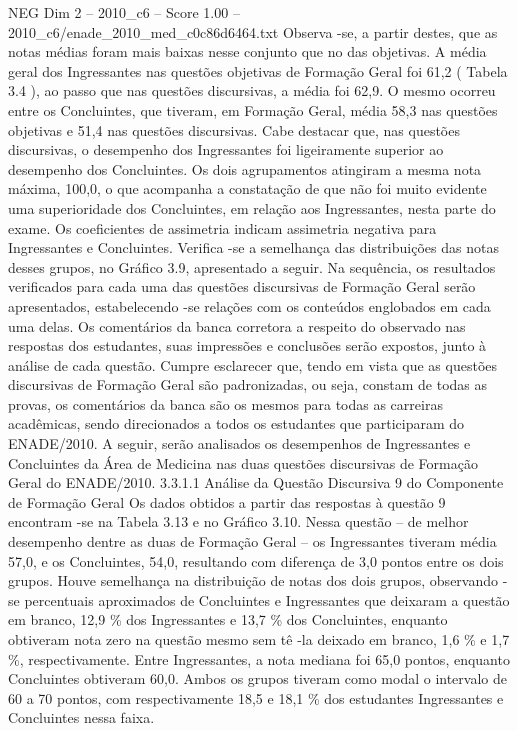 \begin{textsample}{NEG Dim 2 – 2010\_c6 – Score 1.00 – 2010\_c6/enade\_2010\_med\_c0c86d6464.txt}
Observa -se, a partir destes, que as notas médias foram mais baixas nesse conjunto que no das objetivas.
A média geral dos Ingressantes nas questões objetivas de Formação Geral foi 61,2 ( Tabela 3.4 ), ao passo que nas questões discursivas, a média foi 62,9.
O mesmo ocorreu entre os Concluintes, que tiveram, em Formação Geral, média 58,3 nas questões objetivas e 51,4 nas questões discursivas.
Cabe destacar que, nas questões discursivas, o desempenho dos Ingressantes foi ligeiramente superior ao desempenho dos Concluintes.
Os dois agrupamentos atingiram a mesma nota máxima, 100,0, o que acompanha a constatação de que não foi muito evidente uma superioridade dos Concluintes, em relação aos Ingressantes, nesta parte do exame.
Os coeficientes de assimetria indicam assimetria negativa para Ingressantes e Concluintes.
Verifica -se a semelhança das distribuições das notas desses grupos, no Gráfico 3.9, apresentado a seguir.
Na sequência, os resultados verificados para cada uma das questões discursivas de Formação Geral serão apresentados, estabelecendo -se relações com os conteúdos englobados em cada uma delas.
Os comentários da banca corretora a respeito do observado nas respostas dos estudantes, suas impressões e conclusões serão expostos, junto à análise de cada questão.
Cumpre esclarecer que, tendo em vista que as questões discursivas de Formação Geral são padronizadas, ou seja, constam de todas as provas, os comentários da banca são os mesmos para todas as carreiras acadêmicas, sendo direcionados a todos os estudantes que participaram do ENADE/2010.
A seguir, serão analisados os desempenhos de Ingressantes e Concluintes da Área de Medicina nas duas questões discursivas de Formação Geral do ENADE/2010. 3.3.1.1 Análise da Questão Discursiva 9 do Componente de Formação Geral Os dados obtidos a partir das respostas à questão 9 encontram -se na Tabela 3.13 e no Gráfico 3.10.
Nessa questão – de melhor desempenho dentre as duas de Formação Geral – os Ingressantes tiveram média 57,0, e os Concluintes, 54,0, resultando com diferença de 3,0 pontos entre os dois grupos.
Houve semelhança na distribuição de notas dos dois grupos, observando -se percentuais aproximados de Concluintes e Ingressantes que deixaram a questão em branco, 12,9 \% dos Ingressantes e 13,7 \% dos Concluintes, enquanto obtiveram nota zero na questão mesmo sem tê -la deixado em branco, 1,6 \% e 1,7 \%, respectivamente.
Entre Ingressantes, a nota mediana foi 65,0 pontos, enquanto Concluintes obtiveram 60,0.
Ambos os grupos tiveram como modal o intervalo de 60 a 70 pontos, com respectivamente 18,5 e 18,1 \% dos estudantes Ingressantes e Concluintes nessa faixa.

\end{textsample}
